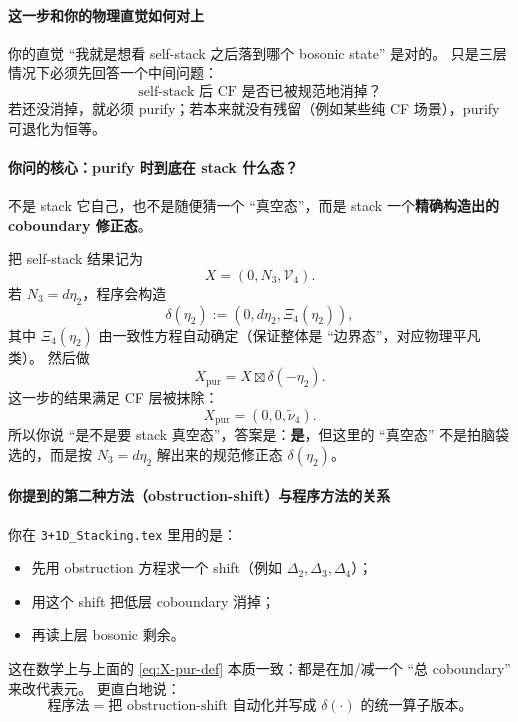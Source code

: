 \documentclass[a4paper,fontset=ubuntu,12pt]{ctexart}
\begin{document}
\paragraph{这一步和你的物理直觉如何对上}
你的直觉 ``我就是想看 self-stack 之后落到哪个 bosonic state'' 是对的。
只是三层情况下必须先回答一个中间问题：
\begin{equation}
\text{self-stack 后 CF 是否已被规范地消掉？}
\label{eq:middle-question}
\end{equation}
若还没消掉，就必须 purify；若本来就没有残留（例如某些纯 CF 场景），purify 可退化为恒等。

\paragraph{你问的核心：purify 时到底在 stack 什么态？}
不是 stack 它自己，也不是随便猜一个 ``真空态''，而是 stack 一个\textbf{精确构造出的 coboundary 修正态}。

把 self-stack 结果记为
\begin{equation}
X=(0,N_3,\mathcal{V}_4).
\label{eq:X-three-layer}
\end{equation}
若 $N_3=d\eta_2$，程序会构造
\begin{equation}
\delta(\eta_2):=(0,d\eta_2,\Xi_4(\eta_2)),
\label{eq:delta-eta2}
\end{equation}
其中 $\Xi_4(\eta_2)$ 由一致性方程自动确定（保证整体是 ``边界态''，对应物理平凡类）。
然后做
\begin{equation}
X_{\mathrm{pur}}=X\boxtimes \delta(-\eta_2).
\label{eq:X-pur-def}
\end{equation}
这一步的结果满足 CF 层被抹除：
\begin{equation}
X_{\mathrm{pur}}=(0,0,\widetilde{\nu}_4).
\label{eq:X-pur-result}
\end{equation}
所以你说 ``是不是要 stack 真空态''，答案是：\textbf{是}，但这里的 ``真空态'' 不是拍脑袋选的，而是按 $N_3=d\eta_2$ 解出来的规范修正态 $\delta(\eta_2)$。

\paragraph{你提到的第二种方法（obstruction-shift）与程序方法的关系}
你在 \texttt{3+1D\_Stacking.tex} 里用的是：
\begin{itemize}
\item 先用 obstruction 方程求一个 shift（例如 $\Delta_2,\Delta_3,\Delta_4$）；
\item 用这个 shift 把低层 coboundary 消掉；
\item 再读上层 bosonic 剩余。
\end{itemize}
这在数学上与上面的 \eqref{eq:X-pur-def} 本质一致：都是在加/减一个 ``总 coboundary'' 来改代表元。  
更直白地说：
\begin{equation}
\text{程序法}=\text{把 obstruction-shift 自动化并写成 }\delta(\cdot)\text{ 的统一算子版本。}
\label{eq:method-equivalent}
\end{equation}
\end{document}
